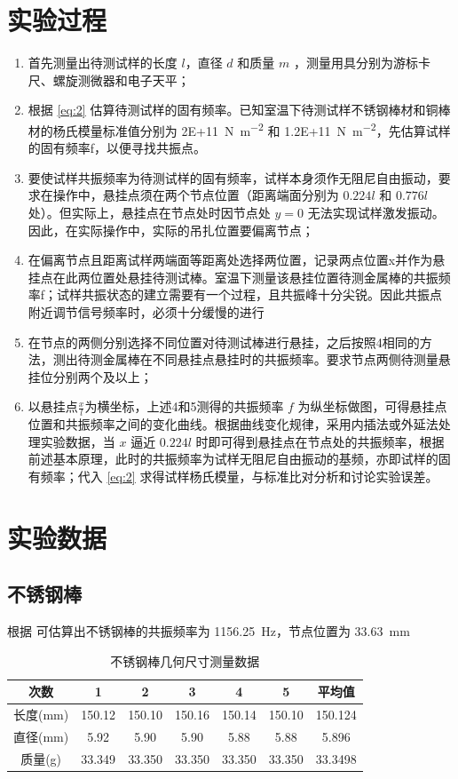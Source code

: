 \documentclass[a4paper,utf8]{article}
\begin{document}
\section{实验过程}%
    \begin{enumerate}
        \item 首先测量出待测试样的长度 $l$，直径 $d$ 和质量 $m$ ，测量用具分别为游标卡尺、螺旋测微器和电子天平；
        \item 根据 \eqref{eq:2} 估算待测试样的固有频率。已知室温下待测试样不锈钢棒材和铜棒材的杨氏模量标准值分别为 \SI{2E+11}{\N\per\m^2} 和 \SI{1.2E+11}{\N\per\m^2}，先估算试样的固有频率f，以便寻找共振点。
        \item 要使试样共振频率为待测试样的固有频率，试样本身须作无阻尼自由振动，要求在操作中，悬挂点须在两个节点位置（距离端面分别为 $0.224l$ 和 $0.776l$ 处）。但实际上，悬挂点在节点处时因节点处 $y=0$ 无法实现试样激发振动。因此，在实际操作中，实际的吊扎位置要偏离节点；
        \item 在偏离节点且距离试样两端面等距离处选择两位置，记录两点位置x并作为悬挂点在此两位置处悬挂待测试棒。室温下测量该悬挂位置待测金属棒的共振频率f；试样共振状态的建立需要有一个过程，且共振峰十分尖锐。因此共振点附近调节信号频率时，必须十分缓慢的进行
        \item 在节点的两侧分别选择不同位置对待测试棒进行悬挂，之后按照4相同的方法，测出待测金属棒在不同悬挂点悬挂时的共振频率。要求节点两侧待测量悬挂位分别两个及以上；
        \item 以悬挂点$\frac{x}{l}$为横坐标，上述4和5测得的共振频率 $f$ 为纵坐标做图，可得悬挂点位置和共振频率之间的变化曲线。根据曲线变化规律，采用内插法或外延法处理实验数据，当 $x$ 逼近 $0.224l$ 时即可得到悬挂点在节点处的共振频率，根据前述基本原理，此时的共振频率为试样无阻尼自由振动的基频，亦即试样的固有频率；代入 \eqref{eq:2} 求得试样杨氏模量，与标准比对分析和讨论实验误差。 
    \end{enumerate}

\section{实验数据}
\subsection{不锈钢棒}
根据 可估算出不锈钢棒的共振频率为 \SI{1156.25}{\Hz}，节点位置为 \SI{33.63}{\mm}
\begin{table}[!ht]
    \caption{不锈钢棒几何尺寸测量数据}\label{tab:steelSize}
    \begin{tabular}{c *{5}{S[table-format=3.3]} S[table-format=3.4]} \toprule
        次数 & {1} & {2} & {3} & {4} & {5} & {平均值} \\ \midrule
        长度(\unit{\mm}) & 150.12 & 150.10 & 150.16 & 150.14 & 150.10 & 150.124 \\ 
        直径(\unit{\mm}) & 5.92 & 5.90 & 5.90 & 5.88 & 5.88 & 5.896 \\ 
        质量(\unit{\g}) & 33.349 & 33.350 & 33.350 & 33.350 & 33.350 & 33.3498 \\ \bottomrule
    \end{tabular}
\end{table}
\end{document}
